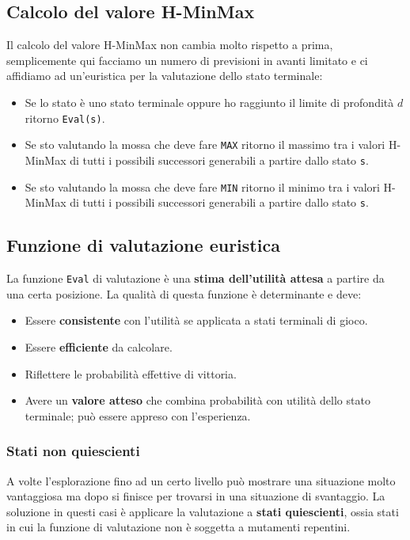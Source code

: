 \subsection{Calcolo del valore H-MinMax}
Il calcolo del valore H-MinMax non cambia molto rispetto a prima, semplicemente qui facciamo un numero di previsioni in
avanti limitato e ci affidiamo ad un'euristica per la valutazione dello stato terminale:
\begin{itemize}
	\item Se lo stato \`e uno stato terminale oppure ho raggiunto il limite di profondit\`a $d$ ritorno \verb|Eval(s)|.
	\item Se sto valutando la mossa che deve fare \verb|MAX| ritorno il massimo tra i valori H-MinMax di tutti i possibili
	      successori generabili a partire dallo stato \verb|s|.
	\item Se sto valutando la mossa che deve fare \verb|MIN| ritorno il minimo tra i valori H-MinMax di tutti i possibili
	      successori generabili a partire dallo stato \verb|s|.
\end{itemize}

\subsection{Funzione di valutazione euristica}
La funzione \verb|Eval| di valutazione \`e una \textbf{stima dell'utilit\`a attesa} a partire da una certa posizione.
La qualit\`a di questa funzione \`e determinante e deve:
\begin{itemize}
	\item Essere \textbf{consistente} con l'utilit\`a se applicata a stati terminali di gioco.
	\item Essere \textbf{efficiente} da calcolare.
	\item Riflettere le probabilit\`a effettive di vittoria.
	\item Avere un \textbf{valore atteso} che combina probabilit\`a con utilit\`a dello stato terminale; pu\`o essere
	      appreso con l'esperienza.
\end{itemize}

\subsubsection{Stati non quiescienti}
A volte l'esplorazione fino ad un certo livello pu\`o mostrare una situazione molto vantaggiosa ma dopo si finisce per
trovarsi in una situazione di svantaggio. La soluzione in questi casi \`e applicare la valutazione a
\textbf{stati quiescienti}, ossia stati in cui la funzione di valutazione non \`e soggetta a mutamenti repentini.

